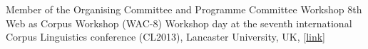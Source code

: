         {Member of the Organising Committee and Programme Committee}
        {Workshop}
        {8th Web as Corpus Workshop (WAC-8)}
        {Workshop day at the seventh international Corpus Linguistics
        conference (CL2013), Lancaster University, UK,
        [\href{https://sigwac.org.uk/wiki/WAC8}{link}]}
        {}




